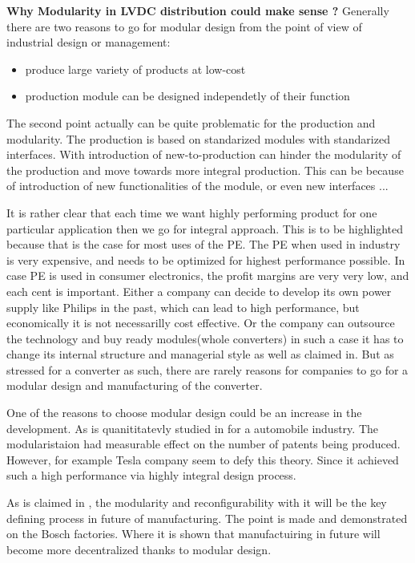 \documentclass[]{scrartcl}
\begin{document}
\textbf{Why Modularity in LVDC distribution could make sense ?} 
Generally there are two reasons to go for modular design from the point of view of industrial design or management\cite{Huang1998}:
\begin{itemize}
	\item produce large variety of products at low-cost
	\item production module can be designed independetly of their function
\end{itemize}

The second point actually can be quite problematic for the production and modularity. The production is based on standarized modules with standarized interfaces. With introduction of new-to-production \cite{JulianaHsuanMikkola2003} can hinder the modularity of the production and move towards more integral production. This can be because of introduction of new functionalities of the module, or even new interfaces ... 



It is rather clear that each time we want highly performing product for one particular application then we go for integral approach. This is to be highlighted because that is the case for most uses of the PE. The PE when used in industry is very expensive, and needs to be optimized for highest performance possible. In case PE is used in consumer electronics, the profit margins are very very low, and each cent is important. Either a company can decide to develop its own power supply like Philips in the past, which can lead to high performance, but economically it is not necessarilly cost effective. Or the company can outsource the technology and buy ready modules(whole converters) in such a case it has to change its internal structure and managerial style as well as claimed in\cite{Fine2005}. But as stressed for a converter as such, there are rarely reasons for companies to go for a modular design and manufacturing of the converter. 

One of the reasons to choose modular design could be an increase in the development. As is quanititatevly studied in \cite{Wang2010} for a automobile industry. The modularistaion had measurable effect on the number of patents being produced. However, for example Tesla company seem to defy this theory. Since it achieved such a high performance via highly integral design process. 

As is claimed in \cite{Sch??fer2007}, the modularity and reconfigurability with it will be the key defining process in future of manufacturing. The point is made and demonstrated on the Bosch factories.  Where it is shown that manufactuiring in future will become more decentralized thanks to modular design.
\end{document}
